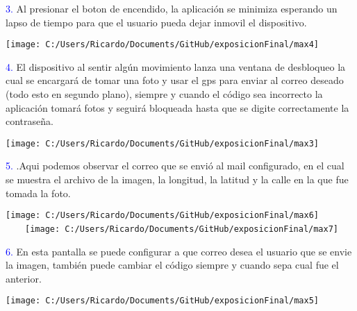 \documentclass{beamer}
\begin{document}
\begin{frame}
       \scriptsize
        
          \textcolor{blue}{3.}
       Al presionar el boton de encendido, la aplicación se minimiza esperando un lapso de tiempo para que el usuario pueda dejar inmovil el dispositivo.
           \begin{center}
                 \texttt{[image: C:/Users/Ricardo/Documents/GitHub/exposicionFinal/max4]} 
         \end{center}

        \textcolor{blue}{4.}
         El dispositivo al sentir algún movimiento lanza una ventana de desbloqueo la cual se encargará de tomar una foto y usar el gps para enviar al correo deseado (todo esto en segundo plano), siempre y cuando el código sea incorrecto la aplicación tomará fotos y seguirá bloqueada hasta que se digite correctamente la contraseña.
           \begin{center}
                   \texttt{[image: C:/Users/Ricardo/Documents/GitHub/exposicionFinal/max3]} 
         \end{center}
  \end{frame}
    
\begin{frame}
       \scriptsize
   \textcolor{blue}{5.}
        .Aqui podemos observar el correo que se envió al mail configurado, en el cual se muestra el archivo de la imagen, la longitud, la latitud y la calle en la que fue tomada la foto.
            \begin{center}
                 \texttt{[image: C:/Users/Ricardo/Documents/GitHub/exposicionFinal/max6]} \ \ \ \
 \texttt{[image: C:/Users/Ricardo/Documents/GitHub/exposicionFinal/max7]} 
            \end{center}
      
 \textcolor{blue}{6.}
        En esta pantalla se puede configurar a que correo desea el usuario que se envie la imagen, también puede cambiar el código siempre y cuando sepa cual fue el anterior.
           \begin{center}
                 \texttt{[image: C:/Users/Ricardo/Documents/GitHub/exposicionFinal/max5]} 
         \end{center}
  \end{frame}
    
  
\end{document}
